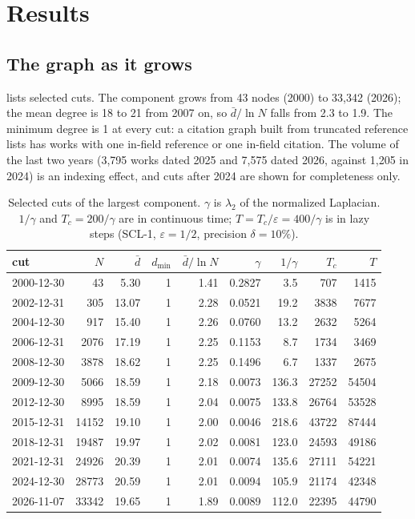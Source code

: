 \documentclass[11pt]{article}
\begin{document}
\section{Results}
\subsection{The graph as it grows}
 lists selected cuts. The component grows from 43 nodes (2000) to 33,342 (2026); the mean
degree is 18 to 21 from 2007 on, so $\bar d/\ln N$ falls from 2.3 to 1.9. The minimum degree is 1 at
every cut: a citation graph built from truncated reference lists has works with one in-field
reference or one in-field citation. The volume of the last two years (3,795 works dated 2025 and
7,575 dated 2026, against 1,205 in 2024) is an indexing effect, and cuts after 2024 are shown for
completeness only.

\begin{table}[t]
\centering
\caption{Selected cuts of the largest component. $\gamma$ is $\lambda_2$ of the normalized
Laplacian. $1/\gamma$ and $T_c = 200/\gamma$ are in continuous time; $T = T_c/\varepsilon = 400/\gamma$ is in
lazy steps (SCL-1, $\varepsilon = 1/2$, precision $\delta = 10\%$).}\label{tab:cuts}
\begin{tabular}{lrrrrrrrr}
\toprule
cut & $N$ & $\bar d$ & $d_{\min}$ & $\bar d/\ln N$ & $\gamma$ & $1/\gamma$ & $T_c$ & $T$ \\
\midrule
2000-12-30 & 43 & 5.30 & 1 & 1.41 & 0.2827 & 3.5 & 707 & 1415 \\
2002-12-31 & 305 & 13.07 & 1 & 2.28 & 0.0521 & 19.2 & 3838 & 7677 \\
2004-12-30 & 917 & 15.40 & 1 & 2.26 & 0.0760 & 13.2 & 2632 & 5264 \\
2006-12-31 & 2076 & 17.19 & 1 & 2.25 & 0.1153 & 8.7 & 1734 & 3469 \\
2008-12-30 & 3878 & 18.62 & 1 & 2.25 & 0.1496 & 6.7 & 1337 & 2675 \\
2009-12-30 & 5066 & 18.59 & 1 & 2.18 & 0.0073 & 136.3 & 27252 & 54504 \\
2012-12-30 & 8995 & 18.59 & 1 & 2.04 & 0.0075 & 133.8 & 26764 & 53528 \\
2015-12-31 & 14152 & 19.10 & 1 & 2.00 & 0.0046 & 218.6 & 43722 & 87444 \\
2018-12-31 & 19487 & 19.97 & 1 & 2.02 & 0.0081 & 123.0 & 24593 & 49186 \\
2021-12-31 & 24926 & 20.39 & 1 & 2.01 & 0.0074 & 135.6 & 27111 & 54221 \\
2024-12-30 & 28773 & 20.59 & 1 & 2.01 & 0.0094 & 105.9 & 21174 & 42348 \\
2026-11-07 & 33342 & 19.65 & 1 & 1.89 & 0.0089 & 112.0 & 22395 & 44790 \\
\bottomrule
\end{tabular}
\end{table}
\end{document}
